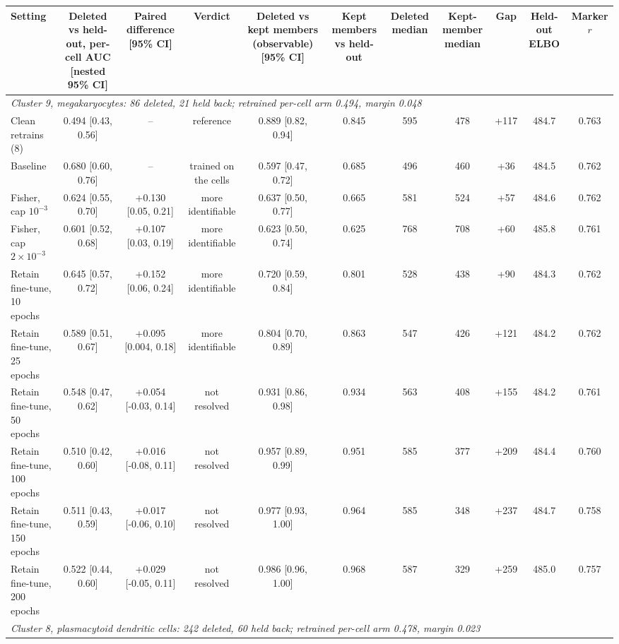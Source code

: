 \begin{tabular}{lcccccccccc}
\toprule
Setting & Deleted vs held-out, per-cell AUC [nested 95\% CI] & Paired difference [95\% CI] & Verdict & Deleted vs kept members (observable) [95\% CI] & Kept members vs held-out & Deleted median & Kept-member median & Gap & Held-out ELBO & Marker $r$ \\
\midrule
\multicolumn{11}{l}{\emph{Cluster 9, megakaryocytes: 86 deleted, 21 held back; retrained per-cell arm 0.494, margin 0.048}} \\
Clean retrains (8) & 0.494 [0.43, 0.56] & -- & reference & 0.889 [0.82, 0.94] & 0.845 & 595 & 478 & +117 & 484.7 & 0.763 \\
Baseline & 0.680 [0.60, 0.76] & -- & trained on the cells & 0.597 [0.47, 0.72] & 0.685 & 496 & 460 & +36 & 484.5 & 0.762 \\
Fisher, cap $10^{-3}$ & 0.624 [0.55, 0.70] & +0.130 [0.05, 0.21] & more identifiable & 0.637 [0.50, 0.77] & 0.665 & 581 & 524 & +57 & 484.6 & 0.762 \\
Fisher, cap $2\times 10^{-3}$ & 0.601 [0.52, 0.68] & +0.107 [0.03, 0.19] & more identifiable & 0.623 [0.50, 0.74] & 0.625 & 768 & 708 & +60 & 485.8 & 0.761 \\
Retain fine-tune, 10 epochs & 0.645 [0.57, 0.72] & +0.152 [0.06, 0.24] & more identifiable & 0.720 [0.59, 0.84] & 0.801 & 528 & 438 & +90 & 484.3 & 0.762 \\
Retain fine-tune, 25 epochs & 0.589 [0.51, 0.67] & +0.095 [0.004, 0.18] & more identifiable & 0.804 [0.70, 0.89] & 0.863 & 547 & 426 & +121 & 484.2 & 0.762 \\
Retain fine-tune, 50 epochs & 0.548 [0.47, 0.62] & +0.054 [-0.03, 0.14] & not resolved & 0.931 [0.86, 0.98] & 0.934 & 563 & 408 & +155 & 484.2 & 0.761 \\
Retain fine-tune, 100 epochs & 0.510 [0.42, 0.60] & +0.016 [-0.08, 0.11] & not resolved & 0.957 [0.89, 0.99] & 0.951 & 585 & 377 & +209 & 484.4 & 0.760 \\
Retain fine-tune, 150 epochs & 0.511 [0.43, 0.59] & +0.017 [-0.06, 0.10] & not resolved & 0.977 [0.93, 1.00] & 0.964 & 585 & 348 & +237 & 484.7 & 0.758 \\
Retain fine-tune, 200 epochs & 0.522 [0.44, 0.60] & +0.029 [-0.05, 0.11] & not resolved & 0.986 [0.96, 1.00] & 0.968 & 587 & 329 & +259 & 485.0 & 0.757 \\
\midrule
\multicolumn{11}{l}{\emph{Cluster 8, plasmacytoid dendritic cells: 242 deleted, 60 held back; retrained per-cell arm 0.478, margin 0.023}} \\

\end{tabular}
